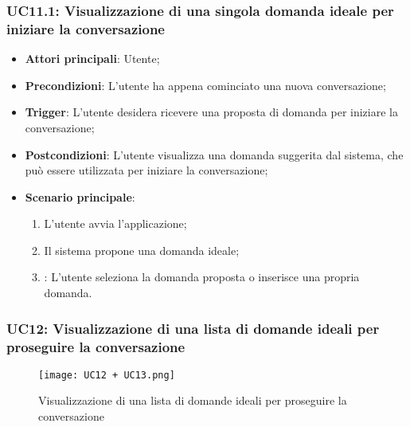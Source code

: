 \subsubsection{UC11.1: Visualizzazione di una singola domanda ideale per iniziare la conversazione}
\begin{itemize}
    \item \textbf{Attori principali}: Utente;
    \item \textbf{Precondizioni}: L'utente ha appena cominciato una nuova conversazione;
    \item \textbf{Trigger}: L'utente desidera ricevere una proposta di domanda per iniziare la conversazione;
    \item \textbf{Postcondizioni}: L'utente visualizza una domanda suggerita dal sistema, che può essere utilizzata per iniziare la conversazione;
    \item \textbf{Scenario principale}:
    \begin{enumerate}
        \item L'utente avvia l'applicazione;
        \item Il sistema propone una domanda ideale;
        \item {}: L'utente seleziona la domanda proposta o inserisce una propria domanda.
    \end{enumerate}
\end{itemize}

\newpage

\hypertarget{UC12}{}
\subsubsection{UC12: Visualizzazione di una lista di domande ideali per proseguire la conversazione}

\begin{figure}[h]
    \centering
    \texttt{[image: UC12 + UC13.png]}
    \caption{Visualizzazione di una lista di domande ideali per proseguire la conversazione}
\end{figure}

